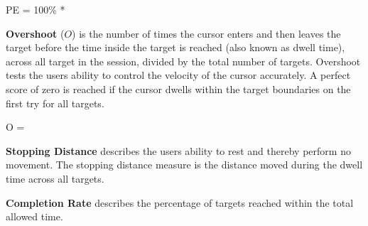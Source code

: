 	\begin{flalign}
	PE = 100\% * 
	\label{ID}
	\end{flalign}
		 
 
\textbf{Overshoot} ($O$) is the number of times the cursor enters and then leaves the target before the time inside the target is reached (also known as dwell time), across all target in the session, divided by the total number of targets. Overshoot tests the users ability to control the velocity of the cursor accurately. A perfect score of zero is reached if the cursor dwells within the target boundaries on the first try for all targets. \cite{Poulton2013,Scheme2013}

	\begin{flalign}
	O = \frac{\sum overshoots}{\sum targets}
	\label{ID}
	\end{flalign}
     
\textbf{Stopping Distance} describes the users ability to rest and thereby perform no movement. The stopping distance measure is the distance moved during the dwell time across all targets. \cite{Scheme2013}


\textbf{Completion Rate} describes the percentage of targets reached within the total allowed time. \cite{Scheme2013,Simon2011}  
 